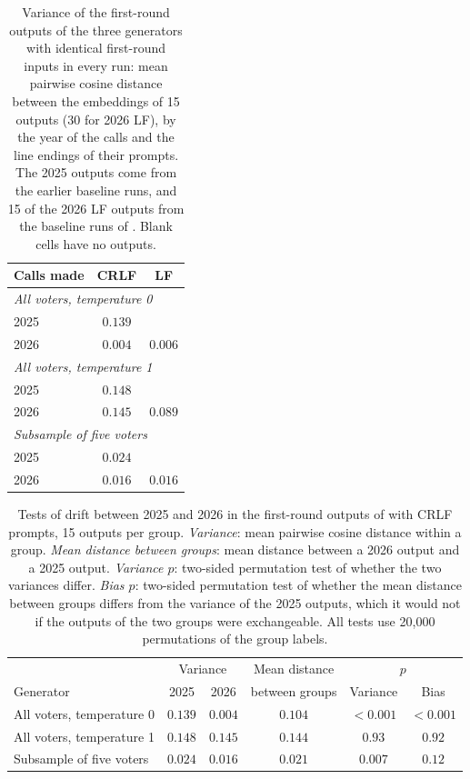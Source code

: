 \documentclass[letterpaper]{article} %
\begin{document}
\begin{table}[t]
\centering
\begin{tabular}{lcc}
\hline
Calls made & CRLF & LF \\
\hline
\multicolumn{3}{l}{\emph{All voters, temperature 0}} \\
2025 & \(0.139\) & \\
2026 & \(0.004\) & \(0.006\) \\
\hline
\multicolumn{3}{l}{\emph{All voters, temperature 1}} \\
2025 & \(0.148\) & \\
2026 & \(0.145\) & \(0.089\) \\
\hline
\multicolumn{3}{l}{\emph{Subsample of five voters}} \\
2025 & \(0.024\) & \\
2026 & \(0.016\) & \(0.016\) \\
\hline
\end{tabular}
\caption{Variance of the first-round outputs of the three generators with identical first-round inputs in every run: mean pairwise cosine distance between the embeddings of 15 outputs (30 for 2026 LF), by the year of the calls and the line endings of their prompts. The 2025 outputs come from the earlier baseline runs, and 15 of the 2026 LF outputs from the baseline runs of . Blank cells have no outputs.}
\label{tab:model-drift-generation}
\end{table}

\begin{table}[t]
\centering
\begin{tabular}{lccccc}
\hline
& \multicolumn{2}{c}{Variance} & Mean distance & \multicolumn{2}{c}{\(p\)} \\
Generator & 2025 & 2026 & between groups & Variance & Bias \\
\hline
All voters, temperature 0 & \(0.139\) & \(0.004\) & \(0.104\) & \(<0.001\) & \(<0.001\) \\
All voters, temperature 1 & \(0.148\) & \(0.145\) & \(0.144\) & \(0.93\) & \(0.92\) \\
Subsample of five voters & \(0.024\) & \(0.016\) & \(0.021\) & \(0.007\) & \(0.12\) \\
\hline
\end{tabular}
\caption{Tests of drift between 2025 and 2026 in the first-round outputs of  with CRLF prompts, 15 outputs per group. \emph{Variance}: mean pairwise cosine distance within a group. \emph{Mean distance between groups}: mean distance between a 2026 output and a 2025 output. \emph{Variance \(p\)}: two-sided permutation test of whether the two variances differ. \emph{Bias \(p\)}: two-sided permutation test of whether the mean distance between groups differs from the variance of the 2025 outputs, which it would not if the outputs of the two groups were exchangeable. All tests use 20{,}000 permutations of the group labels.}
\label{tab:model-drift-generation-tests}
\end{table}
\end{document}
